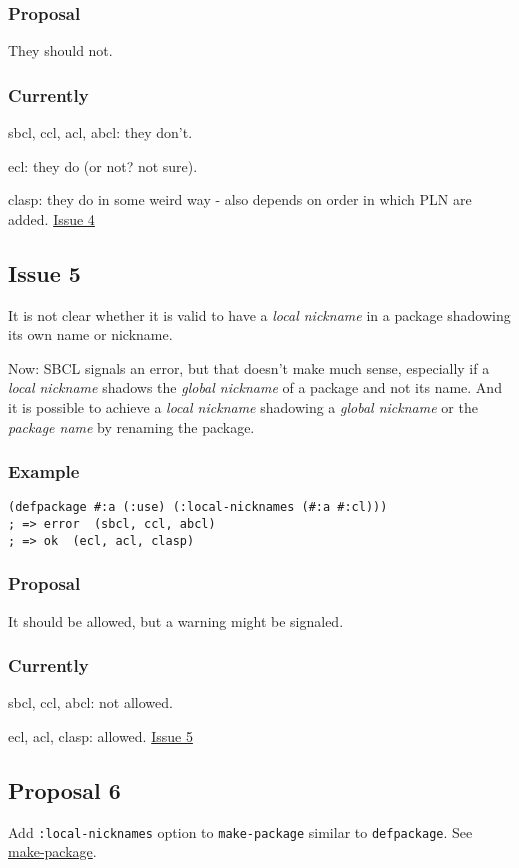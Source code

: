 \documentclass[11pt]{article}
\begin{document}
\subsubsection{Proposal}
\label{sec:org7e752b0}
They should not.
\subsubsection{Currently}
\label{sec:org99e3fea}
sbcl, ccl, acl, abcl: they don't.

ecl: they do (or not? not sure).

 clasp: they do in some weird way - also depends on order in which PLN are
 added.
\href{./issues/4.org}{Issue 4}

\subsection{Issue 5}
\label{sec:org0a1883a}
It is not clear whether it is valid to have a \emph{local nickname} in a package
shadowing its own name or nickname.

Now: SBCL signals an error, but that doesn't make much sense, especially if a
\emph{local nickname} shadows the \emph{global nickname} of a package and not its
name. And it is possible to achieve a \emph{local nickname} shadowing a \emph{global
nickname} or the \emph{package name} by renaming the package.
\subsubsection{Example}
\label{sec:org23afb64}
\begin{verbatim}
(defpackage #:a (:use) (:local-nicknames (#:a #:cl)))
; => error  (sbcl, ccl, abcl)
; => ok  (ecl, acl, clasp)
\end{verbatim}
\subsubsection{Proposal}
\label{sec:org9432416}
It should be allowed, but a warning might be signaled.
\subsubsection{Currently}
\label{sec:orgfd8a0b9}
sbcl, ccl, abcl: not allowed.

 ecl, acl, clasp: allowed.
\href{./issues/5.org}{Issue 5}

\subsection{Proposal 6}
\label{sec:orgc22c0d7}
Add \texttt{:local-nicknames} option to \texttt{make-package} similar to \texttt{defpackage}. See
\hyperref[sec:org916fe2c]{make-package}.
\end{document}
